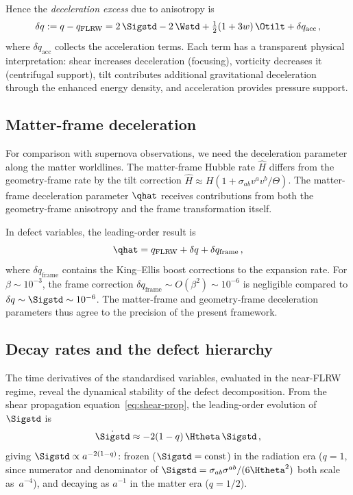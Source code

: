 Hence the \emph{deceleration excess} due to anisotropy is
\begin{equation}\label{eq:delta-q}
\delta q := q - q_{\mathrm{FLRW}}
= 2\,\Sigstd
  - 2\,\Wstd
  + \tfrac{1}{2}(1+3w)\,\Otilt
  + \delta q_{\mathrm{acc}}\,,
\end{equation}
where $\delta q_{\mathrm{acc}}$ collects the acceleration
terms.  Each term has a transparent physical interpretation:
shear increases deceleration (focusing), vorticity decreases
it (centrifugal support), tilt contributes additional
gravitational deceleration through the enhanced energy
density, and acceleration provides pressure support.


\subsection{Matter-frame deceleration}\label{sec:matter-decel}

For comparison with supernova observations, we need the
deceleration parameter along the matter worldlines.  The
matter-frame Hubble rate $\hat{H}$ differs from the
geometry-frame rate by the tilt correction
$\hat{H} \approx H(1 + \sigma_{ab}v^a v^b/\Theta)$.
The matter-frame deceleration parameter $\qhat$ receives
contributions from both the geometry-frame anisotropy and
the frame transformation itself.

In defect variables, the leading-order result is
\begin{equation}\label{eq:qhat}
\qhat = q_{\mathrm{FLRW}} + \delta q
  + \delta q_{\mathrm{frame}}\,,
\end{equation}
where $\delta q_{\mathrm{frame}}$ contains the
King--Ellis boost corrections to the expansion rate.  For
$\beta \sim 10^{-3}$, the frame correction
$\delta q_{\mathrm{frame}} \sim O(\beta^2) \sim 10^{-6}$
is negligible compared to $\delta q \sim \Sigstd \sim 10^{-6}$.
The matter-frame and geometry-frame deceleration parameters
thus agree to the precision of the present framework.


\subsection{Decay rates and the defect hierarchy}
\label{sec:decay-rates}

The time derivatives of the standardised variables, evaluated
in the near-FLRW regime, reveal the dynamical stability of the
defect decomposition.  From the shear propagation
equation~\eqref{eq:shear-prop}, the leading-order evolution
of $\Sigstd$ is
\begin{equation}\label{eq:Sigstd-dot}
\dot{\Sigstd} \approx -2(1 - q)\,\Htheta\,\Sigstd\,,
\end{equation}
giving $\Sigstd \propto a^{-2(1-q)}$: frozen
($\Sigstd = \mathrm{const}$) in the radiation era ($q = 1$,
since numerator and denominator of
$\Sigstd = \sigma_{ab}\sigma^{ab}/(6\Htheta^2)$ both scale
as~$a^{-4}$), and decaying as $a^{-1}$ in the matter era
($q = 1/2$).

